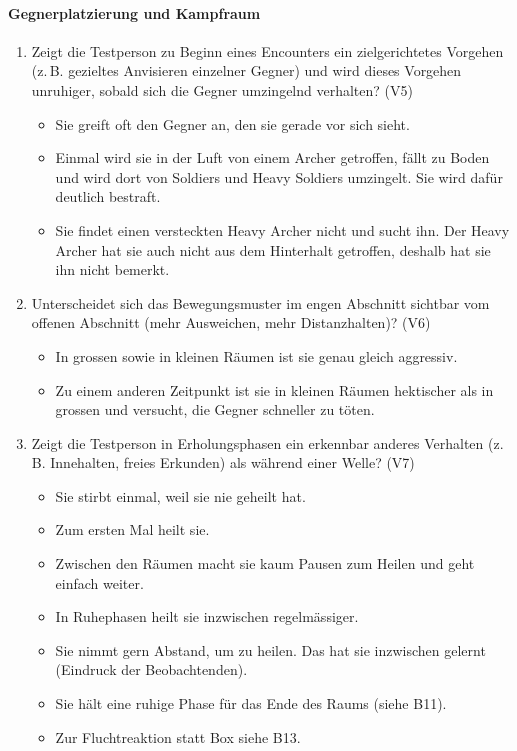 \documentclass[../Main.tex]{subfiles}
\begin{document}
\paragraph{Gegnerplatzierung und Kampfraum}
\begin{enumerate}[label=\textbf{B\arabic*}, leftmargin=1.5cm, itemsep=0.8em, resume]
    \item Zeigt die Testperson zu Beginn eines Encounters ein zielgerichtetes Vorgehen (z.\,B. gezieltes Anvisieren einzelner Gegner) und wird dieses Vorgehen unruhiger, sobald sich die Gegner umzingelnd verhalten? \hfill (V5)
    \begin{itemize}[nosep]
        \item Sie greift oft den Gegner an, den sie gerade vor sich sieht.
        \item Einmal wird sie in der Luft von einem Archer getroffen, fällt zu Boden und wird dort von Soldiers und Heavy Soldiers umzingelt. Sie wird dafür deutlich bestraft.
        \item Sie findet einen versteckten Heavy Archer nicht und sucht ihn. Der Heavy Archer hat sie auch nicht aus dem Hinterhalt getroffen, deshalb hat sie ihn nicht bemerkt.
    \end{itemize}

    \item Unterscheidet sich das Bewegungsmuster im engen Abschnitt sichtbar vom offenen Abschnitt (mehr Ausweichen, mehr Distanzhalten)? \hfill (V6)
    \begin{itemize}[nosep]
        \item In grossen sowie in kleinen Räumen ist sie genau gleich aggressiv.
        \item Zu einem anderen Zeitpunkt ist sie in kleinen Räumen hektischer als in grossen und versucht, die Gegner schneller zu töten.
    \end{itemize}

    \item Zeigt die Testperson in Erholungsphasen ein erkennbar anderes Verhalten (z.\,B. Innehalten, freies Erkunden) als während einer Welle? \hfill (V7)
    \begin{itemize}[nosep]
        \item Sie stirbt einmal, weil sie nie geheilt hat.
        \item Zum ersten Mal heilt sie.
        \item Zwischen den Räumen macht sie kaum Pausen zum Heilen und geht einfach weiter.
        \item In Ruhephasen heilt sie inzwischen regelmässiger.
        \item Sie nimmt gern Abstand, um zu heilen. Das hat sie inzwischen gelernt (Eindruck der Beobachtenden).
        \item Sie hält eine ruhige Phase für das Ende des Raums (siehe B11).
        \item Zur Fluchtreaktion statt Box siehe B13.
    \end{itemize}


\end{enumerate}
\end{document}
